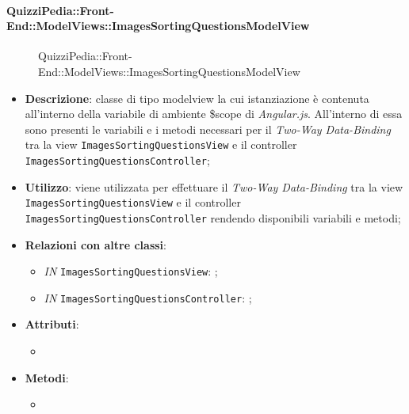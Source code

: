 \paragraph{QuizziPedia::Front-End::ModelViews::ImagesSortingQuestionsModelView}
\begin{figure} [ht]
	\centering
	\caption{QuizziPedia::Front-End::ModelViews::ImagesSortingQuestionsModelView}
\end{figure} \FloatBarrier
\begin{itemize}
	\item \textbf{Descrizione}: classe di tipo modelview la cui istanziazione è contenuta all'interno della variabile di ambiente \$scope di \textit{Angular.js}. All'interno di essa sono presenti le variabili e i metodi necessari per il \textit{Two-Way Data-Binding} tra la view \texttt{ImagesSortingQuestionsView} e il controller \texttt{ImagesSortingQuestionsController}; 
	\item \textbf{Utilizzo}: viene utilizzata per effettuare il \textit{Two-Way Data-Binding} tra la view \texttt{ImagesSortingQuestionsView} e il controller \texttt{ImagesSortingQuestionsController} rendendo disponibili variabili e metodi;
	\item \textbf{Relazioni con altre classi}:
	\begin{itemize}
		\item \textit{IN} \texttt{ImagesSortingQuestionsView}: ; 
		\item \textit{IN} \texttt{ImagesSortingQuestionsController}: ;
	\end{itemize}
	\item \textbf{Attributi}:
	\begin{itemize}
		\item
	\end{itemize}
	\item \textbf{Metodi}:
	\begin{itemize}
		\item 
	\end{itemize}
\end{itemize}

